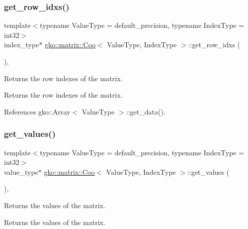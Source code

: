 \subsubsection{\texorpdfstring{get\+\_\+row\+\_\+idxs()}{get\_row\_idxs()}}
{\footnotesize\ttfamily template$<$typename Value\+Type = default\+\_\+precision, typename Index\+Type = int32$>$ \\
index\+\_\+type$\ast$ \hyperlink{classgko_1_1matrix_1_1Coo}{gko\+::matrix\+::\+Coo}$<$ Value\+Type, Index\+Type $>$\+::get\+\_\+row\+\_\+idxs (\begin{DoxyParamCaption}{ }\end{DoxyParamCaption})\hspace{0.3cm}{\ttfamily [inline]}, {\ttfamily [noexcept]}}



Returns the row indexes of the matrix. 

\begin{DoxyReturn}{Returns}
the row indexes of the matrix. 
\end{DoxyReturn}


References gko\+::\+Array$<$ Value\+Type $>$\+::get\+\_\+data().

\mbox{\label{classgko_1_1matrix_1_1Coo_a1ce59517b8d6a8eeaacfed2b19d4057a}} 
\subsubsection{\texorpdfstring{get\+\_\+values()}{get\_values()}}
{\footnotesize\ttfamily template$<$typename Value\+Type = default\+\_\+precision, typename Index\+Type = int32$>$ \\
value\+\_\+type$\ast$ \hyperlink{classgko_1_1matrix_1_1Coo}{gko\+::matrix\+::\+Coo}$<$ Value\+Type, Index\+Type $>$\+::get\+\_\+values (\begin{DoxyParamCaption}{ }\end{DoxyParamCaption})\hspace{0.3cm}{\ttfamily [inline]}, {\ttfamily [noexcept]}}



Returns the values of the matrix. 

\begin{DoxyReturn}{Returns}
the values of the matrix. 
\end{DoxyReturn}


